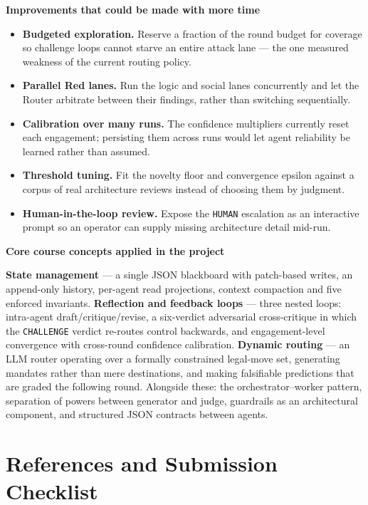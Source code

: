 \documentclass[11pt,a4paper]{article}
\newcommand{\qa}[2]{\textbf{#1}\par\vspace{-2pt}\begin{answerbox}#2\end{answerbox}}
\begin{document}
\qa{Improvements that could be made with more time}{%
\begin{itemize}[nosep]
  \item \textbf{Budgeted exploration.} Reserve a fraction of the round budget for coverage
        so challenge loops cannot starve an entire attack lane --- the one measured
        weakness of the current routing policy.
  \item \textbf{Parallel Red lanes.} Run the logic and social lanes concurrently and let
        the Router arbitrate between their findings, rather than switching sequentially.
  \item \textbf{Calibration over many runs.} The confidence multipliers currently reset
        each engagement; persisting them across runs would let agent reliability be
        learned rather than assumed.
  \item \textbf{Threshold tuning.} Fit the novelty floor and convergence epsilon against a
        corpus of real architecture reviews instead of choosing them by judgment.
  \item \textbf{Human-in-the-loop review.} Expose the \texttt{HUMAN} escalation as an
        interactive prompt so an operator can supply missing architecture detail mid-run.
\end{itemize}}

\qa{Core course concepts applied in the project}{%
\textbf{State management} --- a single JSON blackboard with patch-based writes, an
append-only history, per-agent read projections, context compaction and five enforced
invariants. \textbf{Reflection and feedback loops} --- three nested loops: intra-agent
draft/critique/revise, a six-verdict adversarial cross-critique in which the
\texttt{CHALLENGE} verdict re-routes control backwards, and engagement-level convergence
with cross-round confidence calibration. \textbf{Dynamic routing} --- an LLM router
operating over a formally constrained legal-move set, generating mandates rather than mere
destinations, and making falsifiable predictions that are graded the following round.
Alongside these: the orchestrator--worker pattern, separation of powers between generator
and judge, guardrails as an architectural component, and structured JSON contracts between
agents.}

\section{References and Submission Checklist}
\end{document}
